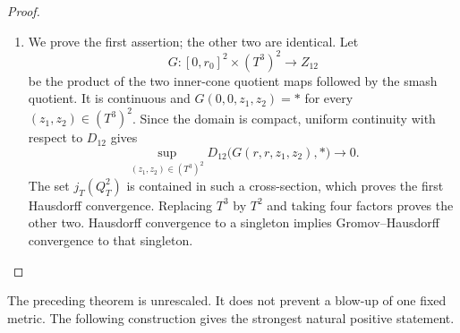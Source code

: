 \begin{proof}
\begin{enumerate}[label=\arabic*.,leftmargin=*]
\item We prove the first assertion; the other two are identical.  Let
\[
 G:[0,r_0]^2\times(T^3)^2\longrightarrow Z_{12}
\]
be the product of the two inner-cone quotient maps followed by the smash
quotient.  It is continuous and
\(G(0,0,z_1,z_2)=*\) for every \((z_1,z_2)\in(T^3)^2\).  Since the domain
is compact, uniform continuity with respect to \(D_{12}\) gives
\[
 \sup_{(z_1,z_2)\in(T^3)^2}
 D_{12}\bigl(G(r,r,z_1,z_2),*\bigr)\longrightarrow0.
\]
The set \(j_T(Q_T^2)\) is contained in such a cross-section, which proves
the first Hausdorff convergence.  Replacing \(T^3\) by \(T^2\) and taking
four factors proves the other two.  Hausdorff convergence to a singleton
implies Gromov--Hausdorff convergence to that singleton.
\end{enumerate}
\end{proof}

The preceding theorem is unrescaled.  It does not prevent a blow-up of one
fixed metric.  The following construction gives the strongest natural
positive statement.

